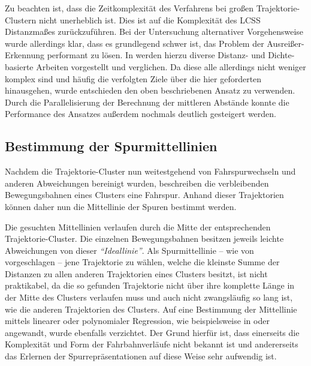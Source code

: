 Zu beachten ist, dass die Zeitkomplexität des Verfahrens bei großen Trajektorie-Clustern
nicht unerheblich ist. Dies ist auf die Komplexität des LCSS Distanzmaßes zurückzuführen.
Bei der Untersuchung alternativer Vorgehensweise wurde allerdings klar, dass es grundlegend schwer ist,
das Problem der Ausreißer-Erkennung performant zu lösen.
In \cite[]{Meng2018} werden hierzu diverse Distanz- und Dichte-basierte
Arbeiten vorgestellt und verglichen. Da diese alle allerdings nicht weniger komplex sind und häufig
die verfolgten Ziele über die hier geforderten hinausgehen, wurde entschieden den oben beschriebenen Ansatz
zu verwenden. Durch die Parallelisierung der Berechnung der mittleren Abstände konnte die Performance
des Ansatzes außerdem nochmals deutlich gesteigert werden.

\subsection{Bestimmung der Spurmittellinien}
\label{sec:real2_define_lane_centerline}

Nachdem die Trajektorie-Cluster nun weitestgehend von Fahrspurwechseln und anderen Abweichungen bereinigt
wurden, beschreiben die verbleibenden Bewegungsbahnen eines Clusters eine Fahrspur.
Anhand dieser Trajektorien können daher nun die Mittellinie der Spuren bestimmt werden.

Die gesuchten Mittellinien verlaufen durch die Mitte der entsprechenden
Trajektorie-Cluster. Die einzelnen Bewegungsbahnen besitzen jeweils leichte Abweichungen von dieser \textit{``Ideallinie''}.
Als Spurmittellinie -- wie von \cite{Hu2005} vorgeschlagen -- jene Trajektorie zu wählen, welche die
kleinste Summe der Distanzen zu allen anderen Trajektorien eines Clusters besitzt, ist nicht praktikabel,
da die so gefunden Trajektorie nicht über ihre komplette Länge in der Mitte des Clusters verlaufen muss
und auch nicht zwangsläufig so lang ist, wie die anderen Trajektorien des Clusters.
Auf eine Bestimmung der Mittellinie mittels linearer oder polynomialer Regression, wie beispielsweise in
\cite[]{Chen2014} oder \cite[]{Melo2006} angewandt,
wurde ebenfalls verzichtet. Der Grund hierfür ist, dass einerseits die Komplexität und Form der Fahrbahnverläufe
nicht bekannt ist und andererseits das Erlernen der Spurrepräsentationen auf diese Weise sehr aufwendig ist.

